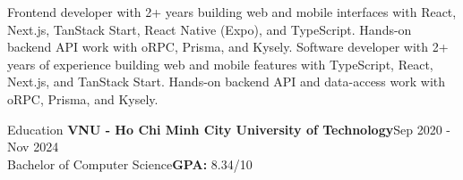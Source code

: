 \documentclass{resume}
\begin{document}
\ifdefined\cvFrontend
\noindent Frontend developer with 2+ years building web and mobile interfaces with React, Next.js, TanStack Start, React Native (Expo), and TypeScript. Hands-on backend API work with oRPC, Prisma, and Kysely.
\else
\noindent Software developer with 2+ years of experience building web and mobile features with TypeScript, React, Next.js, and TanStack Start. Hands-on backend API and data-access work with oRPC, Prisma, and Kysely.
\fi
\par

\begin{rSection}{Education}
{\bf VNU - Ho Chi Minh City University of Technology}\hfill Sep 2020 - Nov 2024\\
Bachelor of Computer Science\hfill {\bf GPA:} 8.34/10
\end{rSection}
\end{document}
